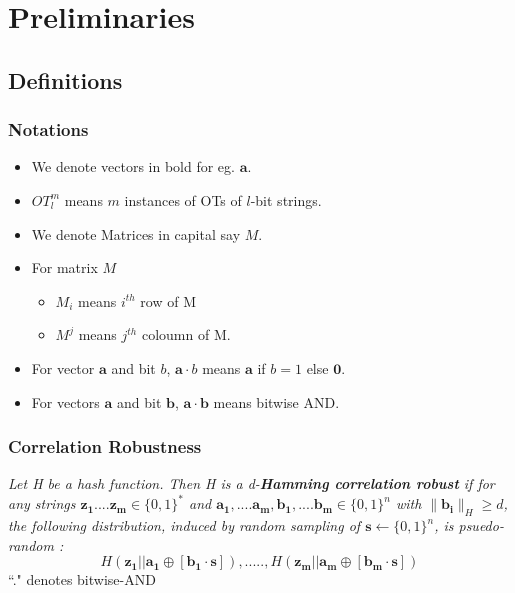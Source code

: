 \documentclass[hyperref={pdfpagelabels=false}]{beamer}
\theoremstyle{remark}
\begin{document}
\section{Preliminaries}
\subsection{Definitions}

\begin{frame}
\frametitle{Notations}
\begin{itemize}
\item We denote vectors in bold for eg. $\mathbf{a}$.
\item $OT_l^m$ means $m$ instances of OTs of $l$-bit strings.
\item We denote Matrices in capital say $M$.
\item For matrix $M$ 
	\begin{itemize}
	\item $M_i$ means $i^{th}$ row of M
	\item $M^j$ means $j^{th}$ coloumn of M.
	\end{itemize}
\item For vector $\mathbf{a}$ and bit $b$, $\mathbf{a} \cdot b$ means $\mathbf{a}$ if $b=1$ else $\mathbf{0}$.
\item For vectors  $\mathbf{a}$ and bit $\mathbf{b}$, $\mathbf{a} \cdot \mathbf{b}$ means bitwise AND.
\end{itemize}

\end{frame}


\begin{frame}
\frametitle{Correlation Robustness}

\begin{definition}[1]
\textit{Let H be a hash function. Then H is a d-\textbf{Hamming correlation robust} if for any strings $\mathbf{z_1}....\mathbf{z_m} \in \{0,1\}^*$ and $\mathbf{a_1},....\mathbf{a_m},\mathbf{b_1},....\mathbf{b_m} \in \{0,1\}^n$ with $\|\mathbf{b_i}\|_H \geq d $, the following distribution, induced by random sampling of $\mathbf{s} \longleftarrow \{0,1\}^n$, is psuedo-random :}
\begin{equation*}
H(\mathbf{z_1}||\mathbf{a_1} \oplus [\mathbf{b_1} \cdot \mathbf{s}]),.....,H(\mathbf{z_m}||\mathbf{a_m} \oplus [\mathbf{b_m} \cdot \mathbf{s}])
\end{equation*}
``." denotes bitwise-AND
\end{definition}
\end{frame}
\end{document}
